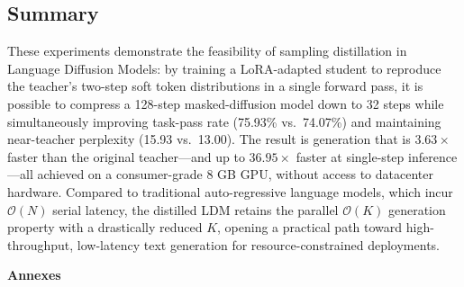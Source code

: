 \documentclass[11pt, a4paper]{article}
\begin{document}
\subsection{Summary}
\label{subsec:conclusion_summary}

These experiments demonstrate the feasibility of sampling distillation in Language Diffusion Models: by training a LoRA-adapted student to reproduce the teacher's two-step soft token distributions in a single forward pass, it is possible to compress a 128-step masked-diffusion model down to 32 steps while simultaneously improving task-pass rate (75.93\% vs.\ 74.07\%) and maintaining near-teacher perplexity (15.93 vs.\ 13.00). The result is generation that is $3.63\times$ faster than the original teacher---and up to $36.95\times$ faster at single-step inference---all achieved on a consumer-grade 8 GB GPU, without access to datacenter hardware. Compared to traditional auto-regressive language models, which incur $\mathcal{O}(N)$ serial latency, the distilled LDM retains the parallel $\mathcal{O}(K)$ generation property with a drastically reduced $K$, opening a practical path toward high-throughput, low-latency text generation for resource-constrained deployments.

\newpage 
\printbibliography


\appendix
\renewcommand{\thesection}{\Alph{section}}

\newpage
\thispagestyle{fancy}
\vspace*{3cm}
\begin{center}
    {\LARGE\bfseries Annexes}
\end{center}

\newcommand{\annexcover}[5]{%
    \newpage
    \thispagestyle{fancy}
    \vspace*{3cm}
    \begin{center}
        {\Large\bfseries #1}\\[1.2em]
        {\large\bfseries #2}\\[2em]
        \begin{tabular}{@{}p{3.5cm} p{10cm}@{}}
            \textbf{Config:}      & #3 \\[0.8em]
            \textbf{Key Metric:}  & #4 \\[0.8em]
            \textbf{Notes:}       & #5 \\
        \end{tabular}
    \end{center}
    \vfill
}
\end{document}
